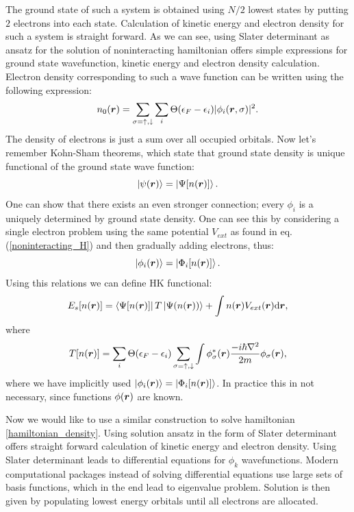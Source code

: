 \documentclass[openany, longbibliography,slovene,a4paper,12pt]{article}
\def\vec#1{\mbox{\boldmath$#1$}}
\newcommand{\dif}{\mathrm{d}}
\begin{document}
 The ground state of such a system is obtained using $N/2$ lowest states by
 putting $2$  electrons into each state. Calculation of kinetic energy and
 electron density for such a system is straight forward. As we can see,
 using Slater  determinant as ansatz for the solution of noninteracting
 hamiltonian offers simple expressions for ground state wavefunction, kinetic
 energy and electron density  calculation. Electron density corresponding to
 such a wave function can be written using the following expression:
 \begin{equation} \label{KS_density}
   n_0(\vec r) = \sum_{\sigma=\uparrow,\downarrow}\sum_i\Theta(\epsilon_F-\epsilon_i)|\phi_i(\vec r, \sigma)|^2.
 \end{equation}
 The density of electrons is just a sum over all occupied orbitals. Now let's
 remember Kohn-Sham theorems, which state that ground state density is unique
 functional of the ground state wave function:
 \begin{equation}
   \ket{\psi(\vec r)}= \ket{\Psi[n(\vec r)]}.
 \end{equation}
 One can show that there exists an even stronger connection; every $\phi_i$ is a
 uniquely determined by ground state density. One can see this by considering a single electron problem using the same potential $V_{ext}$ as found in eq.
 (\ref{noninteracting_H}) and then gradually adding electrons, thus:
 \begin{equation}
   \ket{\phi_i(\vec r)}= \ket{\Phi_i[n(\vec r)]}.
 \end{equation}
 Using this relations we can define HK functional:
 \begin{equation}
   E_s[n(\vec r)] = \bra{\Psi[n(\vec r)]}T \ket{\Psi(n(\vec r))} + \int n(\vec r) V_{ext}(\vec r)  \dif \vec r,
   \end{equation}
 where
\begin{equation} \label{KS_kinetic_term}
   T[n(\vec r)] = \sum_i\Theta(\epsilon_F-\epsilon_i)  \sum_{\sigma=\uparrow,\downarrow}\int \phi^*_\sigma(\vec r)\frac{-i\hbar\nabla^2}{2m}\phi_\sigma(\vec r),
 \end{equation}
 where we have implicitly used $\ket{\phi_i(\vec r)} = \ket{ \Phi_i[n(\vec r)] }$.
 In practice this in not necessary, since functions $\phi(\vec r)$ are known.
 
Now we would like to use a similar construction to solve hamiltonian
\ref{hamiltonian_density}. Using solution ansatz in the form of Slater
determinant offers straight forward calculation of kinetic energy and electron
density. Using Slater determinant leads to differential equations for $\phi_k$
wavefunctions. Modern computational packages instead of solving differential
equations use large sets of basis functions, which in the end lead to
eigenvalue problem. Solution is then given by populating
lowest energy orbitals until all electrons are allocated.
\end{document}
